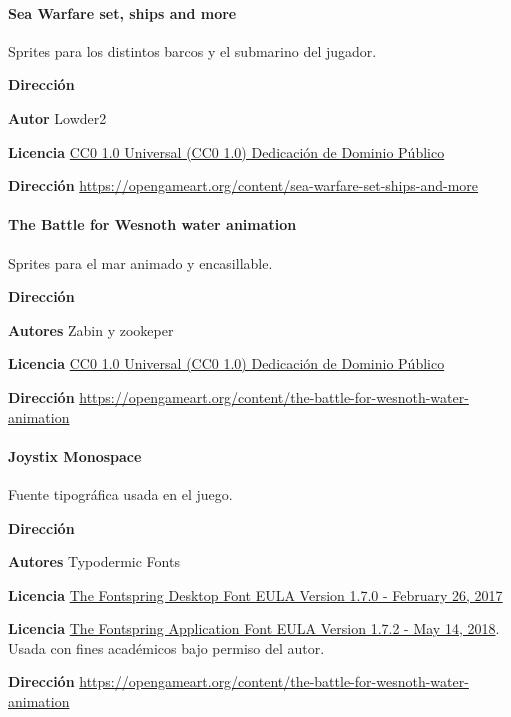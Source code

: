 \documentclass[a4paper,
	11pt,
	parskip=full,
	bibliography=totoc,
	twoside
	]{scrartcl}
\begin{document}
	\paragraph{Sea Warfare set, ships and more}
		Sprites para los distintos barcos y el submarino del jugador.
		\begin{labeling}{\textbf{Dirección}}
			\item[\textbf{Autor}] Lowder2
			\item[\textbf{Licencia}] \href{https://creativecommons.org/publicdomain/zero/1.0/deed.es}{CC0 1.0 Universal (CC0 1.0)
				Dedicación de Dominio Público}
			\item[\textbf{Dirección}] \href{https://opengameart.org/content/sea-warfare-set-ships-and-more}{https://opengameart.org/content/sea-warfare-set-ships-and-more}
		\end{labeling}
	
	\paragraph{The Battle for Wesnoth water animation}
	Sprites para el mar animado y encasillable.
	\begin{labeling}{\textbf{Dirección}}
		\item[\textbf{Autores}] Zabin y zookeper
		\item[\textbf{Licencia}] \href{https://creativecommons.org/publicdomain/zero/1.0/deed.es}{CC0 1.0 Universal (CC0 1.0)
			Dedicación de Dominio Público}
		\item[\textbf{Dirección}] \href{https://opengameart.org/content/the-battle-for-wesnoth-water-animation}{https://opengameart.org/content/the-battle-for-wesnoth-water-animation}
	\end{labeling}

	\paragraph{Joystix Monospace}
	Fuente tipográfica usada en el juego.
	\begin{labeling}{\textbf{Dirección}}
		\item[\textbf{Autores}] Typodermic Fonts
		\item[\textbf{Licencia}] \href{https://www.fontspring.com/lic/jcefupvyrh}{The Fontspring Desktop Font EULA Version 1.7.0 - February 26, 2017} 
		\item[\textbf{Licencia}] \href{https://www.fontspring.com/lic/avhl0opgxj}{The Fontspring Application Font EULA Version 1.7.2 - May 14, 2018}. Usada con fines académicos bajo permiso del autor.
		\item[\textbf{Dirección}] \href{https://opengameart.org/content/the-battle-for-wesnoth-water-animation}{https://opengameart.org/content/the-battle-for-wesnoth-water-animation}
	\end{labeling}
\end{document}
